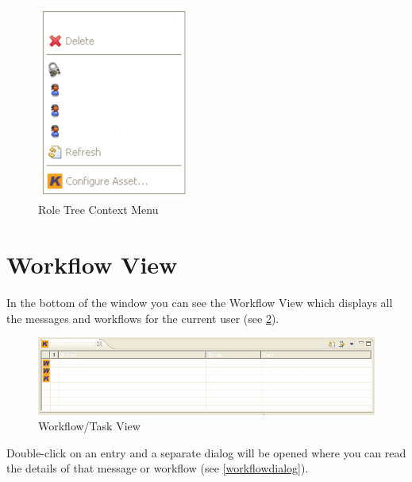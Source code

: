 \begin{figure}[h!]
\begin{center}
\includegraphics[width=5cm]{rolekontext.png}
   \caption{Role Tree Context Menu}
\label{rolekontext}
\end{center}
\end{figure}\par



\section{Workflow View}

In the bottom of the window you can see the Workflow View which displays all 
the messages and workflows for the current user (see \ref{workflow}). 

\begin{figure}[h!]
\begin{center}
\includegraphics[width=15cm]{workflow.png}
   \caption{Workflow/Task View}
\label{workflow}
\end{center}
\end{figure}\par

Double-click on an entry and a 
separate dialog will be opened where you can read the details of that message or
workflow (see \ref{workflowdialog}).

